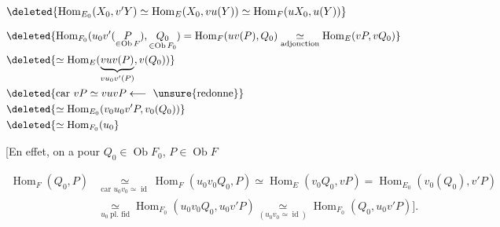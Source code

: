 \\
$\deleted{\operatorname{Hom}_{E_0}(X_0,v'Y)\simeq\operatorname{Hom}_{E}(X_0,vu(Y))\simeq\operatorname{Hom}_{F}(uX_0,u(Y))}$


\[
\begin{aligned}
&\deleted{\operatorname{Hom}_{F_0}(u_0v'(\underset{\in\operatorname{Ob}F}{P}),\underset{\in\operatorname{Ob}F_0}{Q_0})=\operatorname{Hom}_{F}(uv(P),Q_0)
 \underset{\text{adjonction}}{\simeq}\operatorname{Hom}_{E}(vP,vQ_0)}\\
&\deleted{\simeq\operatorname{Hom}_{E}(\underbrace{vuv(P)}_{vu_0v'(P)},v(Q_0))}\\
&\deleted{\text{car }vP\simeq vuvP\longleftarrow\ \unsure{\text{redonne}}}\\
&\deleted{\simeq\operatorname{Hom}_{E_0}(v_0u_0v'P,v_0(Q_0))}\\
&\deleted{\simeq\operatorname{Hom}_{F_0}(u_0}
\end{aligned}
\]

[En effet, on a pour $Q_0\in\operatorname{Ob}F_0$, $P\in\operatorname{Ob}F$

\[
\begin{aligned}
\operatorname{Hom}_{F}(Q_0,P)&\underset{\text{car }u_0v_0\simeq\operatorname{id}}{\simeq}
\operatorname{Hom}_{F}(u_0v_0Q_0,P)\simeq\operatorname{Hom}_{E}(v_0Q_0,vP)=\operatorname{Hom}_{E_0}(v_0(Q_0),v'P)\\
&\underset{u_0\ \text{pl. fid}}{\simeq}\operatorname{Hom}_{F_0}(u_0v_0Q_0,u_0v'P)
\underset{(u_0v_0\simeq\operatorname{id})}{\simeq}\operatorname{Hom}_{F_0}(Q_0,u_0v'P)\big].
\end{aligned}
\]


